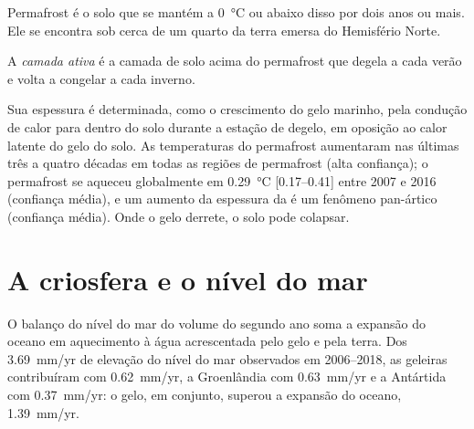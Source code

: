 Permafrost é o solo que se mantém a \qty{0}{\celsius} ou abaixo disso por dois anos
ou mais. Ele se encontra sob cerca de um quarto da terra emersa do
Hemisfério Norte.

\begin{definition}\label{def:b3:glaciology:permafrost}
A \emph{camada ativa} é a camada de solo acima do permafrost que degela
a cada verão e volta a congelar a cada inverno.
\end{definition}

Sua espessura é determinada, como o crescimento do gelo marinho, pela condução de calor
para dentro do solo durante a estação de degelo, em oposição ao calor latente do
gelo do solo. As temperaturas do permafrost aumentaram nas últimas três a
quatro décadas em todas as regiões de permafrost (alta confiança);
o permafrost se aqueceu globalmente em \qty{0.29}{\celsius} [\numrange{0.17}{0.41}]
entre 2007 e 2016 (confiança média), e um aumento da espessura da  é um fenômeno pan-ártico (confiança média).
Onde o gelo derrete, o solo pode colapsar.

\section{A criosfera e o nível do mar}\label{sec:b3:glaciology:sea-level}

O balanço do nível do mar do volume do segundo ano soma a expansão do oceano em aquecimento
à água acrescentada pelo gelo e pela terra. Dos
\qty{3.69}{mm/yr} de elevação do nível do mar observados em 2006--2018, as geleiras
contribuíram com \qty{0.62}{mm/yr}, a Groenlândia com \qty{0.63}{mm/yr} e a Antártida
com \qty{0.37}{mm/yr}: o gelo, em conjunto, superou a expansão do oceano,
\qty{1.39}{mm/yr}.

